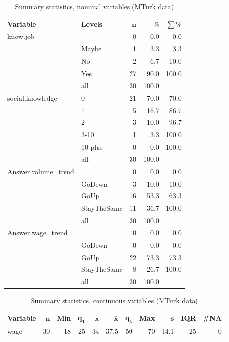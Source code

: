 \documentclass[a4paper,10pt]{article}\usepackage[]{graphicx}\usepackage[]{color}
\begin{document}
\begin{table}[ht]
\centering
{\footnotesize
\begin{tabular}{ll|rrr}
 \textbf{Variable} & \textbf{Levels} & $\mathbf{n}$ & $\mathbf{\%}$ & $\mathbf{\sum \%}$ \\ 
  \hline
know.job &  & 0 & 0.0 & 0.0 \\ 
   & Maybe & 1 & 3.3 & 3.3 \\ 
   & No & 2 & 6.7 & 10.0 \\ 
   & Yes & 27 & 90.0 & 100.0 \\ 
   \hline
 & all & 30 & 100.0 &  \\ 
   \hline
\hline
social.knowledge & 0 & 21 & 70.0 & 70.0 \\ 
   & 1 & 5 & 16.7 & 86.7 \\ 
   & 2 & 3 & 10.0 & 96.7 \\ 
   & 3-10 & 1 & 3.3 & 100.0 \\ 
   & 10-plus & 0 & 0.0 & 100.0 \\ 
   \hline
 & all & 30 & 100.0 &  \\ 
   \hline
\hline
Answer.volume\_trend &  & 0 & 0.0 & 0.0 \\ 
   & GoDown & 3 & 10.0 & 10.0 \\ 
   & GoUp & 16 & 53.3 & 63.3 \\ 
   & StayTheSame & 11 & 36.7 & 100.0 \\ 
   \hline
 & all & 30 & 100.0 &  \\ 
   \hline
\hline
Answer.wage\_trend &  & 0 & 0.0 & 0.0 \\ 
   & GoDown & 0 & 0.0 & 0.0 \\ 
   & GoUp & 22 & 73.3 & 73.3 \\ 
   & StayTheSame & 8 & 26.7 & 100.0 \\ 
   \hline
 & all & 30 & 100.0 &  \\ 
   \hline
\hline
\end{tabular}
}
\caption{Summary statistics, nominal variables (MTurk data)} 
\label{tab1:29-1120}
\end{table}
\begin{table}[ht]
\centering
{\footnotesize
\begin{tabular}{lrrrrrrrrrr}
 \textbf{Variable} & $\mathbf{n}$ & \textbf{Min} & $\mathbf{q_1}$ & $\mathbf{\widetilde{x}}$ & $\mathbf{\bar{x}}$ & $\mathbf{q_3}$ & \textbf{Max} & $\mathbf{s}$ & \textbf{IQR} & \textbf{\#NA} \\ 
  \hline
wage & 30 & 18 & 25 & 34 & 37.5 & 50 & 70 & 14.1 & 25 & 0 \\ 
  \end{tabular}
}
\caption{Summary statistics, continuous variables (MTurk data)} 
\label{tab2:29-1120}
\end{table}
\end{document}
